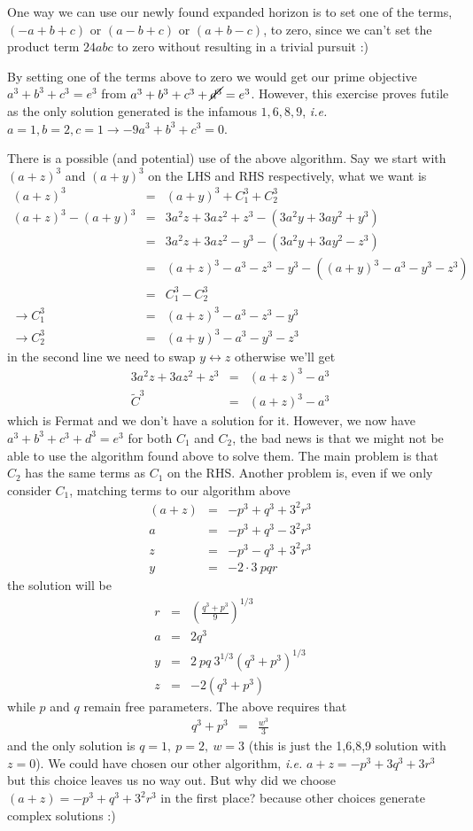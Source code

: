 \documentclass[aps,preprint,preprintnumbers,nofootinbib,showpacs,prd]{revtex4-1}
\newcommand{\ie}{{\it i.e.} }
\newcommand{\nbea}{\begin{eqnarray*}}
\newcommand{\neea}{\end{eqnarray*}}
\begin{document}
One way we can use our newly found expanded horizon is to set one of the terms, $(-a+b+c)$ or $(a-b+c)$ or $(a+b-c)$, to zero, since we can't set the product term $24abc$ to zero without resulting in a trivial pursuit :)

By setting one of the terms above to zero we would get our prime objective $a^3 + b^3 + c^3 = e^3 $ from $a^3 + b^3 + c^3 + \cancel{d^3} = e^3$. However, this exercise proves futile as the only solution generated is the infamous $1,6,8,9$, \ie $a = 1, b = 2, c = 1 \rightarrow -9a^3 + b^3 + c^3 = 0$.

There is a  possible (and potential) use of the above algorithm. Say we start with $(a+z)^3$ and $(a+y)^3$ on the LHS and RHS respectively, what we want is
%
\nbea
(a+z)^3 & = & (a+y)^3 + C_1^3 + C_2^3 \\
(a+z)^3 - (a+y)^3 & = & 3 a^2 z + 3 a z^2 + z^3 - (3 a^2 y + 3 a y^2 + y^3) \\
& = & 3 a^2 z + 3 a z^2 - y^3 - (3 a^2 y + 3 a y^2 - z^3) \\
& = & (a+z)^3 - a^3 - z^3 - y^3 - ((a+y)^3 - a^3 - y^3 - z^3) \\
& = & C_1^3 - C_2^3 \\
\rightarrow C_1^3 & = & (a+z)^3 - a^3 - z^3 - y^3 \\
\rightarrow C_2^3 & = & (a+y)^3 - a^3 - y^3 - z^3
\neea
%
in the second line we need to swap $y \leftrightarrow z$ otherwise we'll get
%
\nbea
3 a^2 z + 3 a z^2 + z^3 & = & (a+z)^3 - a^3 \\
\tilde C ^3 & = & (a+z)^3 - a^3
\neea
%
which is Fermat and we don't have a solution for it. However, we now have $a^3 + b^3 + c^3 + d^3 = e^3$ for both $C_1$ and $C_2$, the bad news is that we might not be able to use the algorithm found above to solve them. The main problem is that $C_2$ has the same terms as $C_1$ on the RHS. Another problem is, even if we only consider $C_1$, matching terms to our algorithm above
%
\nbea
(a+z) & = & -p^3 + q^3 + 3^2 r^3 \\
a & = & -p^3 + q^3 - 3^2 r^3 \\
z & = & -p^3 - q^3 + 3^2 r^3 \\
y & = & - 2 \cdot 3 ~ pqr
\neea
%
the solution will be
%
\nbea
r & = & \left ( \frac{q^3 + p^3}{9} \right )^{1/3} \\
a & = & 2 q^3 \\
y & = & 2~pq~3^{1/3} (q^3 + p^3)^{1/3} \\
z & = & -2(q^3 + p^3)
\neea
%
while $p$ and $q$ remain free parameters. The above requires that 
%
\nbea
q^3 + p^3 & = & \frac{w^3}{3}
\neea
and the only solution is $q = 1,~p=2, ~w=3$ (this is just the 1,6,8,9 solution with $z=0$). We could have chosen our other algorithm, \ie $a+z = -p^3 + 3 q^3 + 3 r^3$ but this choice leaves us no way out. But why did we choose $(a+z) = -p^3 + q^3 + 3^2 r^3$ in the first place? because other choices generate complex solutions :)
\end{document}
